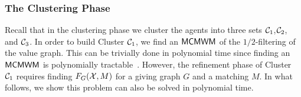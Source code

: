 \begin{comment}
\subsubsection{Computing the value of $\MMS_i$ in polynomial time}\label{mmsi}
As described in the beginning of Section \ref{additive}, finding the exact value of $\MMS_i$ for an agent is $NP-hard$ and there is no polynomial time algorithm for this problem, unless $P=NP$. In \cite{epstein2014efficient}, this problem is studied in the context of job scheduling. In addition to the hardness proof, they proposed a PTAS for finding a $(1+\epsilon)$ approximation of $\MMS_i$ which yields to a ploynomial time algorithm for finding $\MMS_i$, for constant $\epsilon$.  

Thus, in the beginning of the algorithm, we can compute $\MMS_i$ for every agent $\agent_i$. Considering the fact the the problem of finding $\MMS_i$ is a maximization problem, we know that the value obtained for $\MMS_i$ by method in \cite{epstein2014efficient}, is at least $\MMS_i (1 - \epsilon)$. Considering this value as $\MMS_i$ has no effect on the correctness of the algorithm except that the final result would be a $(3/4-\epsilon)$-$\MMS$ allocation. Thus, assuming that the rest of the algorithm can be implemented in polynomial time, we have a polynomial time $(3/4-\epsilon)$-$\MMS$ allocation algorithm for contant $\epsilon$. 
\end{comment}
\subsubsection{The Clustering Phase}\label{algcluster}
Recall that in the clustering phase we cluster the agents into three sets $\mathcal{C}_1$,$\mathcal{C}_2$, and $\mathcal{C}_3$. In order to build Cluster $\mathcal{C}_1$, we find an $\textsf{MCMWM}$ of the $1/2$-filtering of the value graph. This can be trivially done in polynomial time since finding an $\textsf{MCMWM}$ is polynomially tractable~\cite{west2001introduction}. However, the refinement phase of Cluster $\mathcal{C}_1$ requires finding $F_G(\mathcal{X},M)$ for a giving graph $G$ and a matching $M$. In what follows, we show this problem can also be solved in polynomial time.

